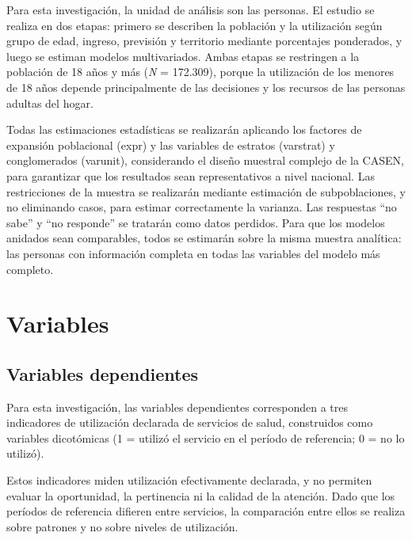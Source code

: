 \documentclass[
  spanish,
  a4paper,
  oneside]{scrbook}
\begin{document}
Para esta investigación, la unidad de análisis son las personas. El
estudio se realiza en dos etapas: primero se describen la población y la
utilización según grupo de edad, ingreso, previsión y territorio
mediante porcentajes ponderados, y luego se estiman modelos
multivariados. Ambas etapas se restringen a la población de 18 años y
más (\emph{N} = 172.309), porque la utilización de los menores de 18
años depende principalmente de las decisiones y los recursos de las
personas adultas del hogar.

Todas las estimaciones estadísticas se realizarán aplicando los factores
de expansión poblacional (expr) y las variables de estratos (varstrat) y
conglomerados (varunit), considerando el diseño muestral complejo de la
CASEN, para garantizar que los resultados sean representativos a nivel
nacional. Las restricciones de la muestra se realizarán mediante
estimación de subpoblaciones, y no eliminando casos, para estimar
correctamente la varianza. Las respuestas ``no sabe'' y ``no responde''
se tratarán como datos perdidos. Para que los modelos anidados sean
comparables, todos se estimarán sobre la misma muestra analítica: las
personas con información completa en todas las variables del modelo más
completo.

\section{Variables}\label{variables}

\subsection{Variables dependientes}\label{variables-dependientes}

Para esta investigación, las variables dependientes corresponden a tres
indicadores de utilización declarada de servicios de salud, construidos
como variables dicotómicas (1 = utilizó el servicio en el período de
referencia; 0 = no lo utilizó).

Estos indicadores miden utilización efectivamente declarada, y no
permiten evaluar la oportunidad, la pertinencia ni la calidad de la
atención. Dado que los períodos de referencia difieren entre servicios,
la comparación entre ellos se realiza sobre patrones y no sobre niveles
de utilización.
\end{document}
